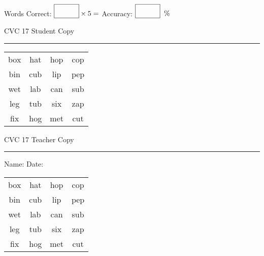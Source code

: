 \documentclass{memoir}
\begin{document}
\normalsize

Words Correct: $\fbox{\phantom{\huge 100}} \times 5 = $ Accuracy: $\fbox{\phantom{\huge 100}}\;\; \%$ 

\vfill

\newpage


\footnotesize \noindent
CVC 17 \hfill Student Copy
\smallskip
\hrule

\huge

\setlength{\tabcolsep}{14pt}
\def\arraystretch{2}

{\selectfont


\begin{vplace}[0.5]
\begin{center}
\begin{tabular}{cccc}
box & hat & hop & cop \\
bin & cub & lip & pep \\
wet & lab & can & sub \\
leg & tub & six & zap \\
fix & hog & met & cut \\
\end{tabular}
\end{center}
\end{vplace}

}

\newpage

\footnotesize \noindent
CVC 17 \hfill Teacher Copy
\smallskip
\hrule

\normalsize

\vfill

\noindent
Name: \underline{\hspace{1.75in}} \hfill Date: \underline{\hspace{1in}}

\huge

{\selectfont


\begin{vplace}[0.5]
\begin{center}
\begin{tabular}{cccc}
box & hat & hop & cop \\
bin & cub & lip & pep \\
wet & lab & can & sub \\
leg & tub & six & zap \\
fix & hog & met & cut \\
\end{tabular}
\end{center}
\end{vplace}



}
\end{document}
